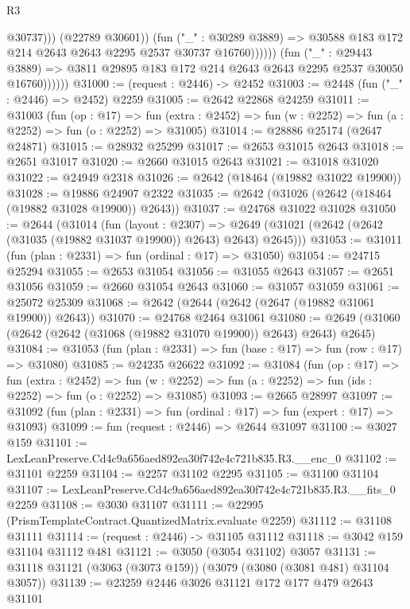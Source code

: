 \begin{lexlean}{R3}
\begin{coremodule}
                                @30737)))
                          (@22789 @30601))
                        (fun ("_" : @30289 @3889) =>
                        @30588 @183 @172 @214 @2643 @2643 @2295 @2537 @30737 @16760))))))
              (fun ("_" : @29443 @3889) =>
              @3811 @29895 @183 @172 @214 @2643 @2643 @2295 @2537 @30050 @16760))))))
@31000 := (request : @2446) -> @2452
@31003 := @2448 (fun ("_" : @2446) => @2452) @2259
@31005 := @2642 @22868 @24259
@31011 := @31003
    (fun (op : @17) =>
    fun (extra : @2452) => fun (w : @2252) => fun (a : @2252) => fun (o : @2252) => @31005)
@31014 := @28886 @25174 (@2647 @24871)
@31015 := @28932 @25299
@31017 := @2653 @31015 @2643
@31018 := @2651 @31017
@31020 := @2660 @31015 @2643
@31021 := @31018 @31020
@31022 := @24949 @2318
@31026 := @2642 (@18464 (@19882 @31022 @19900))
@31028 := @19886 @24907 @2322
@31035 := @2642 (@31026 (@2642 (@18464 (@19882 @31028 @19900)) @2643))
@31037 := @24768 @31022 @31028
@31050 := @2644
    (@31014
      (fun (layout : @2307) =>
      @2649 (@31021 (@2642 (@2642 (@31035 (@19882 @31037 @19900)) @2643) @2643) @2645)))
@31053 := @31011 (fun (plan : @2331) => fun (ordinal : @17) => @31050)
@31054 := @24715 @25294
@31055 := @2653 @31054
@31056 := @31055 @2643
@31057 := @2651 @31056
@31059 := @2660 @31054 @2643
@31060 := @31057 @31059
@31061 := @25072 @25309
@31068 := @2642 (@2644 (@2642 (@2647 (@19882 @31061 @19900)) @2643))
@31070 := @24768 @2464 @31061
@31080 := @2649 (@31060 (@2642 (@2642 (@31068 (@19882 @31070 @19900)) @2643) @2643) @2645)
@31084 := @31053 (fun (plan : @2331) => fun (base : @17) => fun (row : @17) => @31080)
@31085 := @24235 @26622
@31092 := @31084
    (fun (op : @17) =>
    fun (extra : @2452) =>
    fun (w : @2252) => fun (a : @2252) => fun (ids : @2252) => fun (o : @2252) => @31085)
@31093 := @2665 @28997
@31097 := @31092 (fun (plan : @2331) => fun (ordinal : @17) => fun (expert : @17) => @31093)
@31099 := fun (request : @2446) => @2644 @31097
@31100 := @3027 @159
@31101 := LexLeanPreserve.Cd4c9a656aed892ea30f742e4c721b835.R3.__enc_0
@31102 := @31101 @2259
@31104 := @2257 @31102 @2295
@31105 := @31100 @31104
@31107 := LexLeanPreserve.Cd4c9a656aed892ea30f742e4c721b835.R3.__fits_0 @2259
@31108 := @3030 @31107
@31111 := @22995 (PrismTemplateContract.QuantizedMatrix.evaluate @2259)
@31112 := @31108 @31111
@31114 := (request : @2446) -> @31105 @31112
@31118 := @3042 @159 @31104 @31112 @481
@31121 := @3050 (@3054 @31102) @3057
@31131 := @31118 @31121 (@3063 (@3073 @159)) (@3079 (@3080 (@3081 @481) @31104 @3057))
@31139 := @23259 @2446 @3026 @31121 @172 @177 @479 @2643 @31101

\end{coremodule}
\end{lexlean}
